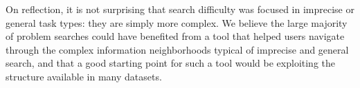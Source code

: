 On reflection, it is not surprising that search difficulty was focused in imprecise or general task types: they are simply more complex. We believe the large majority of problem searches could have benefited from a tool that helped users navigate through the complex information neighborhoods typical of imprecise and general search, and that a good starting point for such a tool would be exploiting the structure available in many datasets. 



%



